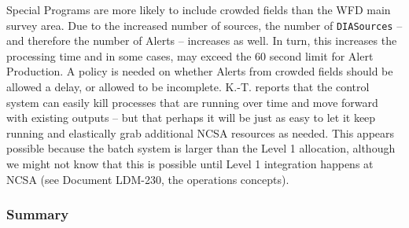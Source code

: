 \documentclass[DM,lsstdraft,toc]{lsstdoc}
\begin{document}
Special Programs are more likely to include crowded fields than the WFD main survey area. Due to the increased number of sources, the number of \texttt{DIASources} -- and therefore the number of Alerts -- increases as well. In turn, this increases the processing time and in some cases, may exceed the 60 second limit for Alert Production. A policy is needed on whether Alerts from crowded fields should be allowed a delay, or allowed to be incomplete. K.-T. reports that the control system can easily kill processes that are running over time and move forward with existing outputs -- but that perhaps it will be just as easy to let it keep running and elastically grab additional NCSA resources as needed. This appears possible because the batch system is larger than the Level 1 allocation, although we might not know that this is possible until Level 1 integration happens at NCSA (see Document LDM-230, the operations concepts).

\subsubsection{Summary}
\end{document}
